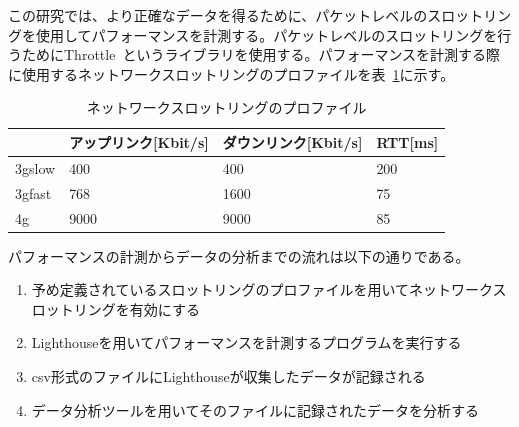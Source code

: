 この研究では、より正確なデータを得るために、パケットレベルのスロットリングを使用してパフォーマンスを計測する。パケットレベルのスロットリングを行うためにThrottle~\cite{Throttle}というライブラリを使用する。パフォーマンスを計測する際に使用するネットワークスロットリングのプロファイルを表~\ref{table:ネットワークスロットリングのプロファイル}に示す。
\begin{table}
  \caption{ネットワークスロットリングのプロファイル}
  \label{table:ネットワークスロットリングのプロファイル}
  \centering
  \begin{tabular}{|p{5em}|p{10em}|p{10em}|p{10em}|}
    \hline
    & アップリンク[Kbit/s] & ダウンリンク[Kbit/s] & RTT[ms] \\ \hline
    3gslow & 400 & 400 & 200 \\ \hline
    3gfast & 768 & 1600 & 75 \\ \hline
    4g & 9000 & 9000 & 85 \\ \hline
  \end{tabular}
\end{table}
パフォーマンスの計測からデータの分析までの流れは以下の通りである。
\begin{enumerate}
    \item 予め定義されているスロットリングのプロファイルを用いてネットワークスロットリングを有効にする
    \item Lighthouseを用いてパフォーマンスを計測するプログラムを実行する
    \item csv形式のファイルにLighthouseが収集したデータが記録される
    \item データ分析ツールを用いてそのファイルに記録されたデータを分析する
\end{enumerate}